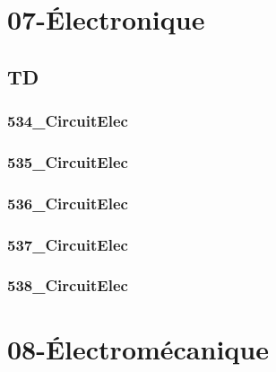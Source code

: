 \clearpage
\chapter{07-Électronique}

\section{TD}

\subsection{534\_CircuitElec}
\graphicspath{{../07-Électronique/TD/534_CircuitElec/images/}{../07-Électronique/TD/534_CircuitElec/}{../Style/png/}}


\subsection{535\_CircuitElec}
\graphicspath{{../07-Électronique/TD/535_CircuitElec/images/}{../07-Électronique/TD/535_CircuitElec/}{../Style/png/}}


\subsection{536\_CircuitElec}
\graphicspath{{../07-Électronique/TD/536_CircuitElec/images/}{../07-Électronique/TD/536_CircuitElec/}{../Style/png/}}


\subsection{537\_CircuitElec}
\graphicspath{{../07-Électronique/TD/537_CircuitElec/images/}{../07-Électronique/TD/537_CircuitElec/}{../Style/png/}}


\subsection{538\_CircuitElec}
\graphicspath{{../07-Électronique/TD/538_CircuitElec/images/}{../07-Électronique/TD/538_CircuitElec/}{../Style/png/}}


\clearpage
\chapter{08-Électromécanique}

